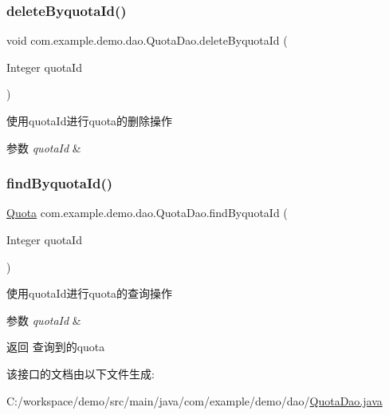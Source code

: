\subsubsection{\texorpdfstring{delete\+Byquota\+Id()}{deleteByquotaId()}}
{\footnotesize\ttfamily void com.\+example.\+demo.\+dao.\+Quota\+Dao.\+delete\+Byquota\+Id (\begin{DoxyParamCaption}\item[{Integer}]{quota\+Id }\end{DoxyParamCaption})}

使用quota\+Id进行quota的删除操作 
\begin{DoxyParams}{参数}
{\em quota\+Id} & \\
\hline
\end{DoxyParams}
\mbox{\label{interfacecom_1_1example_1_1demo_1_1dao_1_1_quota_dao_a5ad72cc401a19f3f40dcb585065764c1}} 
\subsubsection{\texorpdfstring{find\+Byquota\+Id()}{findByquotaId()}}
{\footnotesize\ttfamily \mbox{\hyperlink{classcom_1_1example_1_1demo_1_1modular_1_1_quota}{Quota}} com.\+example.\+demo.\+dao.\+Quota\+Dao.\+find\+Byquota\+Id (\begin{DoxyParamCaption}\item[{Integer}]{quota\+Id }\end{DoxyParamCaption})}

使用quota\+Id进行quota的查询操作 
\begin{DoxyParams}{参数}
{\em quota\+Id} & \\
\hline
\end{DoxyParams}
\begin{DoxyReturn}{返回}
查询到的quota 
\end{DoxyReturn}


该接口的文档由以下文件生成\+:\begin{DoxyCompactItemize}
\item 
C\+:/workspace/demo/src/main/java/com/example/demo/dao/\mbox{\hyperlink{_quota_dao_8java}{Quota\+Dao.\+java}}\end{DoxyCompactItemize}
